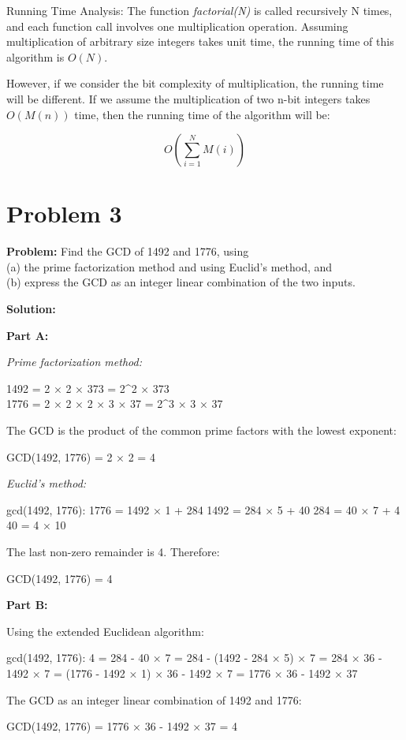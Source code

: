 \documentclass[11pt]{article}
\begin{document}
    Running Time Analysis: The function \textit{factorial(N)} is called recursively N times, and each function call involves one multiplication operation. Assuming multiplication of arbitrary size integers takes unit time, the running time of this algorithm is $O(N)$.

    However, if we consider the bit complexity of multiplication, the running time will be different. If we assume the multiplication of two n-bit integers takes $O(M(n))$ time, then the running time of the algorithm will be:

    $$
    O\left(\sum_{i=1}^{N} M(i)\right)
    $$


    \section{Problem 3}

\textbf{Problem:} Find the GCD of 1492 and 1776, using \\
(a) the prime factorization method and using Euclid's method, and \\
(b) express the GCD as an integer linear combination of the two inputs.

\textbf{Solution:}

\textbf{Part A:}

\emph{Prime factorization method:}

1492 = 2 × 2 × 373 = 2^2 × 373 \\
1776 = 2 × 2 × 2 × 3 × 37 = 2^3 × 3 × 37

The GCD is the product of the common prime factors with the lowest exponent:

GCD(1492, 1776) = 2 × 2 = 4

\emph{Euclid's method:}

gcd(1492, 1776):
  1776 = 1492 × 1 + 284
  1492 = 284 × 5 + 40
  284 = 40 × 7 + 4
  40 = 4 × 10

The last non-zero remainder is 4. Therefore:

GCD(1492, 1776) = 4

\textbf{Part B:}

Using the extended Euclidean algorithm:

gcd(1492, 1776):
  4 = 284 - 40 × 7
    = 284 - (1492 - 284 × 5) × 7
    = 284 × 36 - 1492 × 7
    = (1776 - 1492 × 1) × 36 - 1492 × 7
    = 1776 × 36 - 1492 × 37

The GCD as an integer linear combination of 1492 and 1776:

GCD(1492, 1776) = 1776 × 36 - 1492 × 37 = 4
\end{document}
